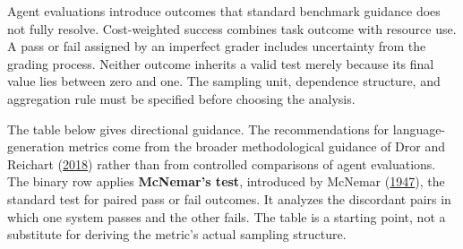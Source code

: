 Agent evaluations introduce outcomes that standard benchmark guidance does not fully resolve. Cost-weighted success combines task outcome with resource use. A pass or fail assigned by an imperfect grader includes uncertainty from the grading process. Neither outcome inherits a valid test merely because its final value lies between zero and one. The sampling unit, dependence structure, and aggregation rule must be specified before choosing the analysis.

The table below gives directional guidance. The recommendations for language-generation metrics come from the broader methodological guidance of Dror and Reichart (\href{https://arxiv.org/abs/1809.01448}{2018}) rather than from controlled comparisons of agent evaluations. The binary row applies \textbf{McNemar's test}, introduced by McNemar (\href{https://doi.org/10.1007/BF02295996}{1947}), the standard test for paired pass or fail outcomes. It analyzes the discordant pairs in which one system passes and the other fails. The table is a starting point, not a substitute for deriving the metric's actual sampling structure.

